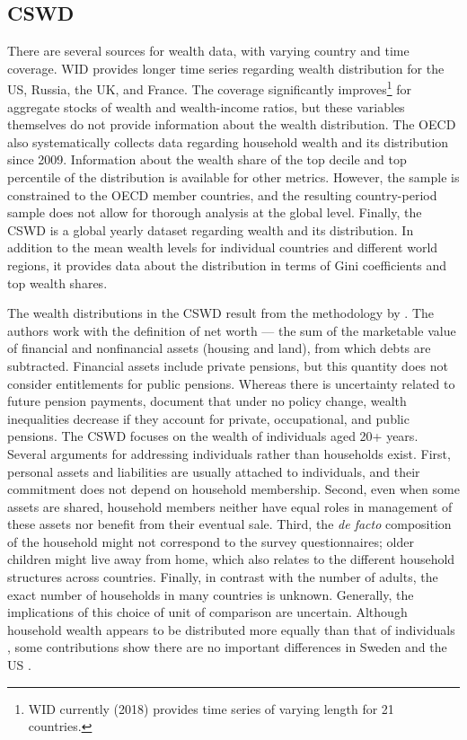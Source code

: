 \documentclass[a4paper,11pt]{article}
\begin{document}
\subsection{CSWD}
There are several sources for wealth data, with varying country and time coverage. \ac{WID} provides longer time series regarding wealth distribution for the \ac{US}, Russia, the \ac{UK}, and France. The coverage significantly improves\footnote{\ac{WID} currently (2018) provides time series of varying length for 21 countries.} for aggregate stocks of wealth and wealth-income ratios, but these variables themselves do not provide information about the wealth distribution. The \ac{OECD} also systematically collects data regarding household wealth and its distribution since 2009. Information about the wealth share of the top decile and top percentile of the distribution is available for other metrics. However, the sample is constrained to the \ac{OECD} member countries, and the resulting country-period sample does not allow for thorough analysis at the global level. Finally, the \ac{CSWD} is a global yearly dataset regarding wealth and its distribution. In addition to the mean wealth levels for individual countries and different world regions, it provides data about the distribution in terms of Gini coefficients and top wealth shares.

The wealth distributions in the \ac{CSWD} result from the methodology by \citet{daviesetal2017}. The authors work with the definition of net worth --- the sum of the marketable value of financial and nonfinancial assets (housing and land), from which debts are subtracted. Financial assets include private pensions, but this quantity does not consider entitlements for public pensions. Whereas there is uncertainty related to future pension payments, \citet{bonke2017} document that under no policy change, wealth inequalities decrease if they account for private, occupational, and public pensions. The \ac{CSWD} focuses on the wealth of individuals aged 20+ years. Several arguments for addressing individuals rather than households exist. First, personal assets and liabilities are usually attached to individuals, and their commitment does not depend on household membership. Second, even when some assets are shared, household members neither have equal roles in management of these assets nor benefit from their eventual sale. Third, the \textit{de facto} composition of the household might not correspond to the survey questionnaires; older children might live away from home, which also relates to the different household structures across countries. Finally, in contrast with the number of adults, the exact number of households in many countries is unknown. Generally, the implications of this choice of unit of comparison are uncertain. Although household wealth appears to be distributed more equally than that of individuals \citet{atkinson2007top}, some contributions show there are no important differences in Sweden and the \ac{US} \citep{roine2009wealth,kopczuksaez2004}. 
\end{document}
